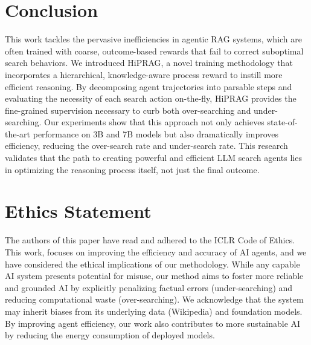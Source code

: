\documentclass{article}
\begin{document}
\section{Conclusion}
\label{sec:conclusion}
This work tackles the pervasive inefficiencies in agentic RAG systems, which are often trained with coarse, outcome-based rewards that fail to correct suboptimal search behaviors. We introduced HiPRAG, a novel training methodology that incorporates a hierarchical, knowledge-aware process reward to instill more efficient reasoning. By decomposing agent trajectories into parsable steps and evaluating the necessity of each search action on-the-fly, HiPRAG provides the fine-grained supervision necessary to curb both over-searching and under-searching. Our experiments show that this approach not only achieves state-of-the-art performance on 3B and 7B models but also dramatically improves efficiency, reducing the over-search rate and under-search rate. This research validates that the path to creating powerful and efficient LLM search agents lies in optimizing the reasoning process itself, not just the final outcome.

\section*{Ethics Statement}
The authors of this paper have read and adhered to the ICLR Code of Ethics. This work, focuses on improving the efficiency and accuracy of AI agents, and we have considered the ethical implications of our methodology. While any capable AI system presents potential for misuse, our method aims to foster more reliable and grounded AI by explicitly penalizing factual errors (under-searching) and reducing computational waste (over-searching). We acknowledge that the system may inherit biases from its underlying data (Wikipedia) and foundation models. By improving agent efficiency, our work also contributes to more sustainable AI by reducing the energy consumption of deployed models.
\end{document}
